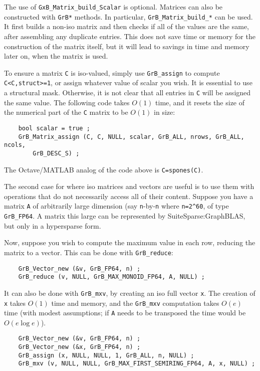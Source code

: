 \documentclass[12pt]{article}
\begin{document}
The use of \verb'GxB_Matrix_build_Scalar' is optional.  Matrices can also be
constructed with \verb'GrB*' methods.  In particular, \verb'GrB_Matrix_build_*'
can be used.  It first builds a non-iso matrix and then checks if all of the
values are the same, after assembling any duplicate entries.  This does not
save time or memory for the construction of the matrix itself, but it will
lead to savings in time and memory later on, when the matrix is used.

To ensure a matrix \verb'C' is iso-valued, simply use \verb'GrB_assign' to
compute \verb'C<C,struct>=1', or assign whatever value of scalar you wish.
It is essential to use a structural mask.  Otherwise, it is not clear that
all entries in \verb'C' will be assigned the same value.  The following
code takes $O(1)$ time, and it resets the size of the numerical part of the
\verb'C' matrix to be $O(1)$ in size:

{\footnotesize
\begin{verbatim}
    bool scalar = true ;
    GrB_Matrix_assign (C, C, NULL, scalar, GrB_ALL, nrows, GrB_ALL, ncols,
        GrB_DESC_S) ; \end{verbatim}}

The Octave/MATLAB analog of the code above is \verb'C=spones(C)'.

The second case for where iso matrices and vectors are useful is to use them
with operations that do not necessarily access all of their content.
Suppose you have a matrix \verb'A' of arbitrarily large dimension (say
\verb'n'-by-\verb'n' where \verb'n=2^60', of type \verb'GrB_FP64'.  A matrix
this large can be represented by SuiteSparse:GraphBLAS, but only in a
hypersparse form.

Now, suppose you wish to compute the maximum value in each row, reducing the
matrix to a vector.  This can be done with \verb'GrB_reduce':

{\footnotesize
\begin{verbatim}
    GrB_Vector_new (&v, GrB_FP64, n) ;
    GrB_reduce (v, NULL, GrB_MAX_MONOID_FP64, A, NULL) ; \end{verbatim}}

It can also be done with \verb'GrB_mxv', by creating an iso full vector
\verb'x'.  The creation of \verb'x' takes $O(1)$ time and memory,
and the \verb'GrB_mxv' computation takes $O(e)$ time (with modest assumptions;
if \verb'A' needs to be transposed the time would be $O(e \log e)$).

{\footnotesize
\begin{verbatim}
    GrB_Vector_new (&v, GrB_FP64, n) ;
    GrB_Vector_new (&x, GrB_FP64, n) ;
    GrB_assign (x, NULL, NULL, 1, GrB_ALL, n, NULL) ;
    GrB_mxv (v, NULL, NULL, GrB_MAX_FIRST_SEMIRING_FP64, A, x, NULL) ; \end{verbatim}}
\end{document}
